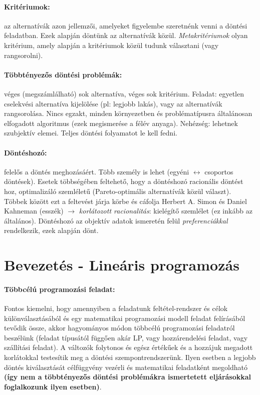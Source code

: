 \documentclass[a4paper,12pt]{article}
\begin{document}
\paragraph{Kritériumok:} az alternatívák azon jellemzői, amelyeket figyelembe szeretnénk venni a döntési feladatban. Ezek alapján döntünk az alternatívák közül. \emph{Metakritériumok} olyan kritérium, amely alapján a kritériumok közül tudunk választani (vagy rangsorolni).

\paragraph{Többtényezős döntési problémák:} véges (megszámlálható) sok alternatíva, véges sok kritérium. Feladat: egyetlen cselekvési alternatíva kijelölése (pl: legjobb lakás), vagy az alternatívák rangsorolása. Nincs egzakt, minden környezetben és problématípusra általánosan elfogadott algoritmus (ezek megismerése a félév anyaga). Nehézség: lehetnek szubjektív elemei. Teljes döntési folyamatot le kell fedni.

\paragraph{Döntéshozó:} felelős a döntés meghozásáért. Több személy is lehet (egyéni $\leftrightarrow$ csoportos döntések). Esetek többségében feltehető, hogy a döntéshozó racionális döntést hoz, optimalizáló szemléletű (Pareto-optimális alternatívák közül választ). Többek között ezt a feltevést járja körbe és cáfolja Herbert A. Simon és Daniel Kahneman (esszék) $\rightarrow$ \emph{korlátozott racionalitás}: kielégítő szemlélet (ez inkább az általános). Döntéshozó az objektív adatok ismeretén felül \emph{preferenciákkal} rendelkezik, ezek alapján dönt.

\section{Bevezetés - Lineáris programozás}

\paragraph{Többcélú programozási feladat: }

Fontos kiemelni, hogy amennyiben a feladatunk feltétel-rendszer és célok különválasztásából és egy matematikai programozási modell feladat felírásából tevődik össze, akkor hagyományos módon többcélú programozási feladatról beszélünk (feladat típusától függően akár LP, vagy hozzárendelési feladat, vagy szállítási feladat). A változók folytonos és egész értékűek és a hozzájuk megadott korlátokkal       testesítik meg a döntési szempontrendszerünk. Ilyen esetben a legjobb döntés kiválasztását célfüggvény vezérli és matematikai feladatként megoldható \textbf{(így nem a többtényezős döntési problémákra ismertetett eljárásokkal foglalkozunk ilyen esetben)}.
\end{document}
